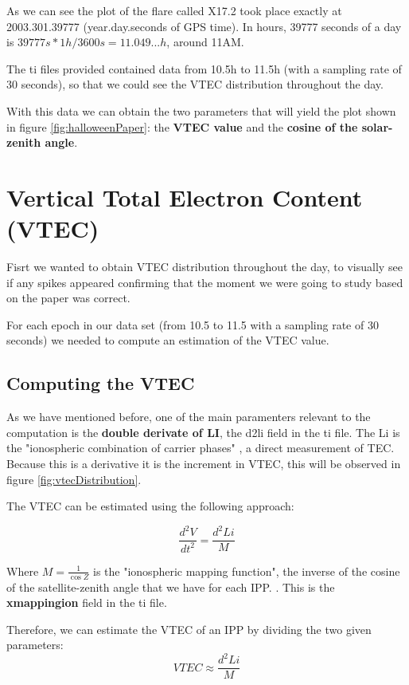 As we can see the plot of the flare called X17.2 took place exactly at 2003.301.39777 (year.day.seconds of GPS time). In hours, 39777 seconds of a day is $39777s * 1h/3600s = 11.049...h$, around 11AM. 

The ti files provided contained data from 10.5h to 11.5h (with a sampling rate of 30 seconds), so that we could see the VTEC distribution throughout the day.

With this data we can obtain the two parameters that will yield the plot shown in figure \ref{fig:halloweenPaper}: the \textbf{VTEC value} and the \textbf{cosine of the solar-zenith angle}.

\section{Vertical Total Electron Content (VTEC)}

Fisrt we wanted to obtain VTEC distribution throughout the day, to visually see if any spikes appeared confirming that the moment we were going to study based on the paper \cite{hernandez2012gnss} was correct.

For each epoch in our data set (from 10.5 to 11.5 with a sampling rate of 30 seconds) we needed to compute an estimation of the VTEC value.

\subsection{Computing the VTEC}

As we have mentioned before, one of the main paramenters relevant to the computation is the \textbf{double derivate of LI}, the d2li field in the ti file. The Li is the "ionospheric combination of carrier phases" \cite{hernandez2012gnss}, a direct measurement of TEC. Because this is a derivative it is the increment in VTEC, this will be observed in figure \ref{fig:vtecDistribution}.

The VTEC can be estimated using the following approach:

\begin{equation} \label{eq:1}
	\frac{d^{2}V}{dt^{2}} = \frac{d^{2}Li}{M}
\end{equation}

Where $M=\frac{1}{\cos Z}$ is the "ionospheric mapping function", the inverse of the cosine of the satellite-zenith angle that we have for each IPP. \cite{hernandez2012gnss}. This is the \textbf{xmappingion} field in the ti file.

Therefore, we can estimate the VTEC of an IPP by dividing the two given parameters:
\begin{equation} \label{eq:2}
	VTEC \approx \frac{d^{2}Li}{M}
\end{equation}

